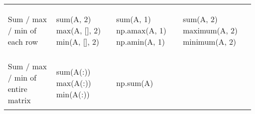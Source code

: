 \documentclass[10pt, landscape]{article}
\newenvironment{Shaded}{}{}
\newcommand{\DecValTok}[1]{\textcolor[rgb]{0.25,0.63,0.44}{{#1}}}
\newcommand{\FloatTok}[1]{\textcolor[rgb]{0.25,0.63,0.44}{{#1}}}
\newcommand{\BuiltInTok}[1]{{#1}}
\newcommand{\NormalTok}[1]{{#1}}
\begin{document}
\begin{multicols*}{2}
\begin{tabular}[ ]{@{}llll@{}}
\begin{minipage}[t]{0.23\columnwidth}
Sum / max / min of each row\strut
\end{minipage} & \begin{minipage}[t]{0.22\columnwidth}\raggedright\strut
\begin{Shaded}
\begin{Highlighting}[]
\NormalTok{sum(A, }\FloatTok{2}\NormalTok{)}
\NormalTok{max(A, [], }\FloatTok{2}\NormalTok{)}
\NormalTok{min(A, [], }\FloatTok{2}\NormalTok{)}
\end{Highlighting}
\end{Shaded}
\strut
\end{minipage} & \begin{minipage}[t]{0.24\columnwidth}\raggedright\strut
\begin{Shaded}
\begin{Highlighting}[]
\BuiltInTok{sum}\NormalTok{(A, }\DecValTok{1}\NormalTok{)}
\NormalTok{np.amax(A, }\DecValTok{1}\NormalTok{)}
\NormalTok{np.amin(A, }\DecValTok{1}\NormalTok{)}
\end{Highlighting}
\end{Shaded}
\strut
\end{minipage} & \begin{minipage}[t]{0.20\columnwidth}\raggedright\strut
\begin{Shaded}
\begin{Highlighting}[]
\NormalTok{sum(A, }\FloatTok{2}\NormalTok{)}
\NormalTok{maximum(A, }\FloatTok{2}\NormalTok{)}
\NormalTok{minimum(A, }\FloatTok{2}\NormalTok{)}
\end{Highlighting}
\end{Shaded}
\strut
\end{minipage}\tabularnewline
\begin{minipage}[t]{0.23\columnwidth}\raggedright\strut
Sum / max / min of entire matrix\strut
\end{minipage} & \begin{minipage}[t]{0.22\columnwidth}\raggedright\strut
\begin{Shaded}
\begin{Highlighting}[]
\NormalTok{sum(A(:))}
\NormalTok{max(A(:))}
\NormalTok{min(A(:))}
\end{Highlighting}
\end{Shaded}
\strut
\end{minipage} & \begin{minipage}[t]{0.24\columnwidth}\raggedright\strut
\begin{Shaded}
\begin{Highlighting}[]
\NormalTok{np.}\BuiltInTok{sum}\NormalTok{(A)}

\end{Highlighting}
\end{Shaded}
\end{minipage}
\end{tabular}
\end{multicols*}
\end{document}
